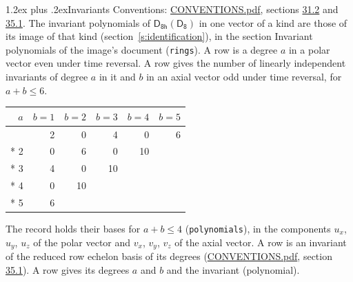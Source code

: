 \documentclass[10pt,a4paper]{article}
\makeatletter
\renewcommand\section{\@startsection{section}{1}{\z@}{-3ex plus -1ex minus -.2ex}%
  {1.2ex plus .2ex}{\normalfont\large\sffamily\bfseries\color{parttitle}}}
\numberwithin{equation}{section}
\newcommand{\grp}[1]{\mathsf{#1}}
\makeatother
\begin{document}
\section{Invariants}\label{s:invariants}
Conventions: \href{../../CONVENTIONS.pdf}{CONVENTIONS.pdf}, sections \href{../../CONVENTIONS.pdf\#conv.31.2}{31.2} and \href{../../CONVENTIONS.pdf\#conv.35.1}{35.1}.
The invariant polynomials of $\grp{D_{8h}}(\grp{D_{8}})$ in one vector of a kind are those of its image of that kind (section~\ref{s:identification}), in the section Invariant polynomials of the image's document (\texttt{rings}).
\leavevmode\label{n:index.degree.polar}\label{n:index.degree.axial}A row is a degree $a$ in a polar vector even under time reversal. A row gives the number of linearly independent invariants of degree $a$ in it and $b$ in an axial vector odd under time reversal, for $a + b \le 6$.
{\small\begin{longtable}{@{}rrrrrr@{}}\toprule
$a$ & $b = 1$ & $b = 2$ & $b = 3$ & $b = 4$ & $b = 5$\\\midrule\endhead
\bottomrule\endfoot\endlastfoot
1 & 2 & 0 & 4 & 0 & 6\\*
2 & 0 & 6 & 0 & 10 & \\*
3 & 4 & 0 & 10 &  & \\*
4 & 0 & 10 &  &  & \\*
5 & 6 &  &  &  & \\
\bottomrule\end{longtable}}
\leavevmode\label{n:local.component.polar}\label{n:local.component.axial}The record holds their bases for $a + b \le 4$ (\texttt{polynomials}), in the components $u_{x}$, $u_{y}$, $u_{z}$ of the polar vector and $v_{x}$, $v_{y}$, $v_{z}$ of the axial vector. \label{n:head.polynomial}A row is an invariant of the reduced row echelon basis of its degrees (\href{../../CONVENTIONS.pdf}{CONVENTIONS.pdf}, section \href{../../CONVENTIONS.pdf\#conv.35.1}{35.1}). A row gives its degrees $a$ and $b$ and the invariant (polynomial).
\end{document}
